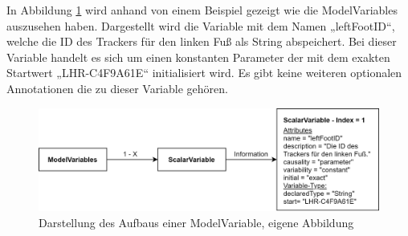 In Abbildung \ref{fig:ModelVariables} wird anhand von einem Beispiel gezeigt wie die ModelVariables auszusehen haben. Dargestellt wird die Variable mit dem Namen „leftFootID“, welche die ID des Trackers für den linken Fuß als String abspeichert. Bei dieser Variable handelt es sich um einen konstanten Parameter der mit dem exakten Startwert „LHR-C4F9A61E“ initialisiert wird. Es gibt keine weiteren optionalen Annotationen die zu dieser Variable gehören.
\begin{figure}[h]
	\centering
	\includegraphics[width=1\linewidth]{Bilder/A30_ModelVariables}
	\caption{Darstellung des Aufbaus einer ModelVariable, eigene Abbildung}
	\label{fig:ModelVariables}
\end{figure}

